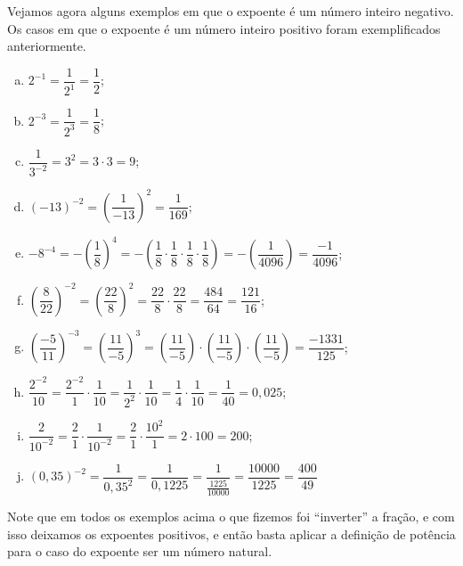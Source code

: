  \begin{exem}
 Vejamos agora alguns exemplos em que o expoente é um número inteiro negativo. Os casos em que o expoente é um número inteiro positivo foram exemplificados anteriormente.

 \begin{enumerate}[a)]
  \item $2^{-1}= \dfrac{1}{2^{1}}= \dfrac{1}{2}$;
  \item $2^{-3}= \dfrac{1}{2^3}= \dfrac{1}{8}$;
  \item $\dfrac{1}{3^{-2}}= 3^2= 3 \cdot 3= 9$;
  \item $(-13)^{-2}= \left( \dfrac{1}{-13} \right)^{2}= \dfrac{1}{169}$;
  \item $-8^{-4}= -\left( \dfrac{1}{8} \right)^{4}= -\left( \dfrac{1}{8} \cdot \dfrac{1}{8} \cdot \dfrac{1}{8} \cdot \dfrac{1}{8} \right)= -\left( \dfrac{1}{4096} \right)= \dfrac{-1}{4096}$;
  \item $\left( \dfrac{8}{22} \right)^{-2}= \left( \dfrac{22}{8} \right)^{2}= \dfrac{22}{8} \cdot \dfrac{22}{8}= \dfrac{484}{64}= \dfrac{121}{16}$;
  \item $\left( \dfrac{-5}{11} \right)^{-3}= \left( \dfrac{11}{-5} \right)^{3}= \left( \dfrac{11}{-5} \right) \cdot \left( \dfrac{11}{-5} \right) \cdot \left( \dfrac{11}{-5} \right)= \dfrac{-1331}{125}$;
  \item $\dfrac{2^{-2}}{10}= \dfrac{2^{-2}}{1} \cdot \dfrac{1}{10}= \dfrac{1}{2^{2}} \cdot \dfrac{1}{10}= \dfrac{1}{4} \cdot \dfrac{1}{10}= \dfrac{1}{40}= 0,025$;
  \item $\dfrac{2}{10^{-2}}= \dfrac{2}{1} \cdot \dfrac{1}{10^{-2}}= \dfrac{2}{1} \cdot \dfrac{10^{2}}{1}= 2 \cdot 100= 200$;
  \item $(0,35)^{-2}= \dfrac{1}{0,35^{2}}= \dfrac{1}{0,1225}= \dfrac{1}{\frac{1225}{10000}}= \dfrac{10000}{1225}= \dfrac{400}{49}$
 \end{enumerate}

 \end{exem}

 Note que em todos os exemplos acima o que fizemos foi ``inverter'' a fração, e com isso deixamos os expoentes positivos, e então basta aplicar a definição de potência para o caso do expoente ser um número natural.

